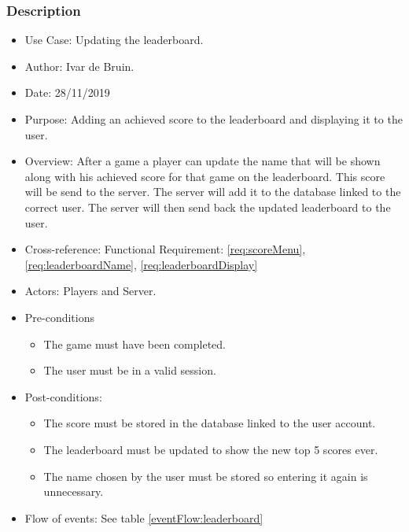 \documentclass[10pt]{article}
\begin{document}
		\subsubsection{Description}
		\begin{itemize}
			\item{Use Case:} Updating the leaderboard.
			\item{Author:} Ivar de Bruin.
			\item{Date:} 28/11/2019
			\item{Purpose:} Adding an achieved score to the leaderboard and displaying it to the user.
			\item{Overview:} After a game a player can update the name that will be shown along with his achieved score for that game on the leaderboard. This score will be send to the server.
			The server will add it to the database linked to the correct user.
			The server will then send back the updated leaderboard to the user.
			\item{Cross-reference:} Functional Requirement: \ref{req:scoreMenu}, \ref{req:leaderboardName}, \ref{req:leaderboardDisplay}
			\item{Actors:} Players and Server.
			\item{Pre-conditions} 
				\begin{itemize}
					\item The game must have been completed.
					\item The user must be in a valid session.
				\end{itemize}
			\item{Post-conditions:}
				\begin{itemize}
					\item The score must be stored in the database linked to the user account.
					\item The leaderboard must be updated to show the new top 5 scores ever.
					\item The name chosen by the user must be stored so entering it again is unnecessary.
				\end{itemize}
			\item{Flow of events:} See table \ref{eventFlow:leaderboard}
		\end{itemize}
\end{document}
